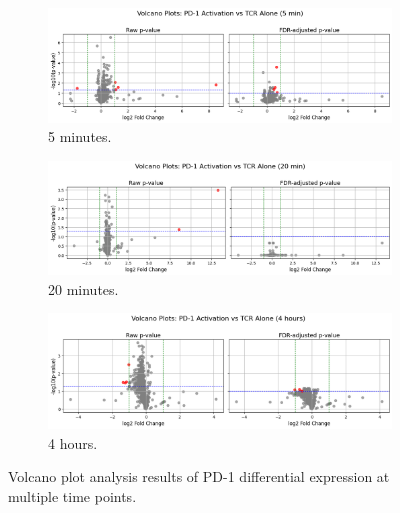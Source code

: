 \documentclass{article}
\begin{document}
      \begin{figure}[H]

          \centering

          \begin{subfigure}{0.8\textwidth}
              \centering
              \includegraphics[width=\linewidth]{figures/volcano_plots_5min.png}
              \caption{5 minutes.}
              \label{fig:volcano_plots_5min}
          \end{subfigure}

          \vspace{1em} %

          \begin{subfigure}{0.8\textwidth}
              \centering
              \includegraphics[width=\linewidth]{figures/volcano_plots_20min.png}
              \caption{20 minutes.}
              \label{fig:volcano_plots_20min}
          \end{subfigure}

          \vspace{1em}

          \begin{subfigure}{0.8\textwidth}
              \centering
              \includegraphics[width=\linewidth]{figures/volcano_plots_4h.png}
              \caption{4 hours.}
              \label{fig:volcano_plots_4h}
          \end{subfigure}

          \caption{Volcano plot analysis results of PD-1 differential expression at multiple time points.}
          \label{fig:volcano_plots}

      \end{figure}
\end{document}
